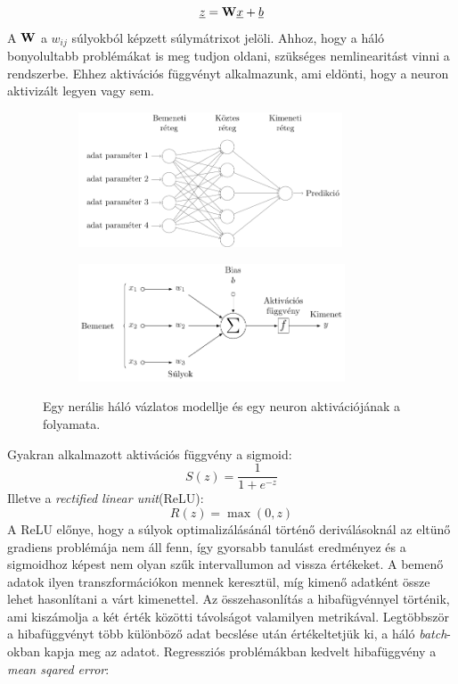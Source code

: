 \documentclass[12pt,letterpaper,twoside,openright]{book}
\begin{document}
\begin{equation}
\underline{z} = \bold{W}\underline x +\underline{b}
\end{equation}
A $\bold{W}$ a $w_{ij}$ súlyokból képzett súlymátrixot jelöli. Ahhoz, hogy a háló bonyolultabb problémákat is meg tudjon oldani, szükséges nemlinearitást vinni a rendszerbe. Ehhez  aktivációs függvényt alkalmazunk, ami eldönti, hogy a neuron aktivizált legyen vagy sem.  
\begin{figure}[]
\centering
\hspace{-2.8 cm}
\begin{subfigure}[b]{0.3\textwidth}
\includegraphics[height=40mm]{Figures/fig1.pdf}
\end{subfigure}\hspace{3.5 cm}
\begin{subfigure}[b]{0.3\textwidth}
\includegraphics[height=35mm]{figures/fig2.pdf}
\end{subfigure}
\caption[Neurális háló vázlatos modellje]{Egy nerális háló vázlatos modellje és egy neuron aktivációjának a folyamata.}

\end{figure}
Gyakran alkalmazott aktivációs függvény a sigmoid:
\begin{equation}
S(z) = \frac{1}{1 + e^{-z}}
\end{equation}
Illetve a \textit{rectified linear unit}(ReLU):
\begin{equation}
R(z) = \max{(0, z)}
\end{equation}
A ReLU előnye, hogy a súlyok optimalizálásánál történő deriválásoknál az eltünő gradiens problémája nem áll fenn, így gyorsabb tanulást eredményez és a sigmoidhoz képest nem olyan szűk intervallumon ad vissza értékeket. A bemenő adatok ilyen transzformációkon mennek keresztül, míg kimenő adatként össze lehet hasonlítani a várt kimenettel. Az összehasonlítás a hibafügvénnyel történik, ami kiszámolja a két érték közötti távolságot valamilyen metrikával. Legtöbbször a hibafüggvényt több különböző adat becslése után értékeltetjük ki, a háló \textit{batch}-okban kapja meg az adatot. Regressziós problémákban kedvelt hibafüggvény a \textit{mean sqared error}:
\end{document}
